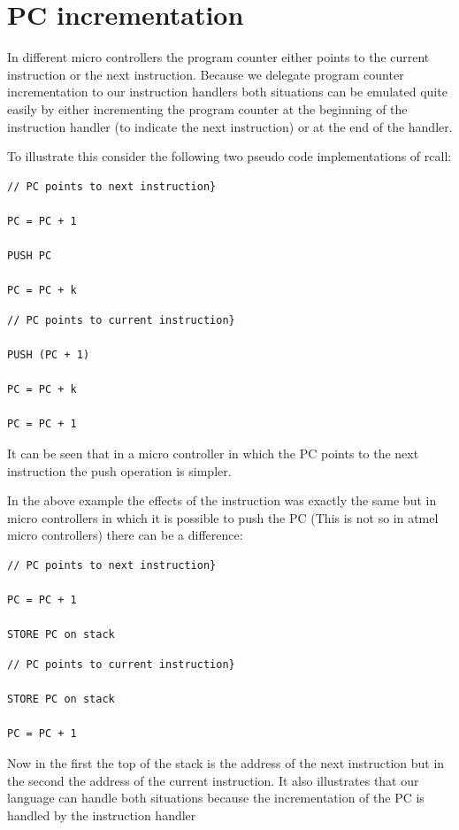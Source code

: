\documentclass[a4paper]{report}
\begin{document}
\clearpage\section[PC incrementation]{PC incrementation}
In different micro controllers the program counter either points to the
current instruction or the next instruction. Because we delegate
program counter incrementation to our instruction handlers both
situations can be emulated quite easily by either incrementing the
program counter at the beginning of the instruction handler (to
indicate the next instruction) or at the end of the handler.

To illustrate this consider the following two pseudo code
implementations of rcall:

\begin{verbatim}
// PC points to next instruction}

PC = PC + 1

PUSH PC

PC = PC + k
\end{verbatim}

\begin{verbatim}
// PC points to current instruction}

PUSH (PC + 1)

PC = PC + k

PC = PC + 1
\end{verbatim}

It can be seen that in a micro controller in which the PC points to the
next instruction the push operation is simpler.

In the above example the effects of the instruction was exactly the same
but in micro controllers in which it is possible to push the PC (This
is not so in atmel micro controllers) there can be a difference:

\begin{verbatim}
// PC points to next instruction}

PC = PC + 1

STORE PC on stack
\end{verbatim}

\begin{verbatim}
// PC points to current instruction}

STORE PC on stack

PC = PC + 1
\end{verbatim}

Now in the first the top of the stack is the address of the next
instruction but in the second the address of the current instruction.
It also illustrates that our language can handle both situations
because the incrementation of the PC is handled by the instruction
handler
\end{document}
